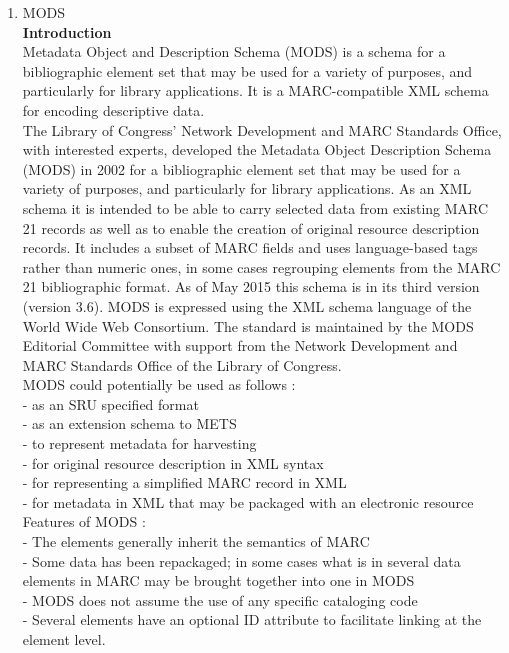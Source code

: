 \begin{enumerate}
	\item MODS\\
	{\bf Introduction}\\
	Metadata Object and Description Schema (MODS) is a schema for a bibliographic element set that may be used for a variety of purposes, and particularly for library applications. It is a MARC-compatible XML schema for encoding descriptive data. \\
	The Library of Congress' Network Development and MARC Standards Office, with interested experts, developed the Metadata Object Description Schema (MODS) in 2002 for a bibliographic element set that may be used for a variety of purposes, and particularly for library applications. As an XML schema it is intended to be able to carry selected data from existing MARC 21 records as well as to enable the creation of original resource description records. It includes a subset of MARC fields and uses language-based tags rather than numeric ones, in some cases regrouping elements from the MARC 21 bibliographic format. As of May 2015 this schema is in its third version (version 3.6). MODS is expressed using the XML schema language of the World Wide Web Consortium. The standard is maintained by the MODS Editorial Committee with support from the Network Development and MARC Standards Office of the Library of Congress.\\
	MODS could potentially be used as follows :\\
	- as an SRU specified format\\
	- as an extension schema to METS\\
	- to represent metadata for harvesting\\
	- for original resource description in XML syntax\\
	- for representing a simplified MARC record in XML\\
	- for metadata in XML that may be packaged with an electronic resource\\
	Features of MODS :\\
	- The elements generally inherit the semantics of MARC\\
	- Some data has been repackaged; in some cases what is in several data elements in MARC may be brought together into one in MODS\\
	- MODS does not assume the use of any specific cataloging code\\
	- Several elements have an optional ID attribute to facilitate linking at the element level.\\

\end{enumerate}
